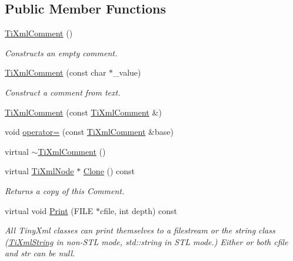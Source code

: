 \subsection*{Public Member Functions}
\begin{DoxyCompactItemize}
\item 
\hyperlink{classTiXmlComment_aaa3252031d3e8bd3a2bf51a1c61201b7}{TiXmlComment} ()
\begin{DoxyCompactList}\small\item\em Constructs an empty comment. \item\end{DoxyCompactList}\item 
\hyperlink{classTiXmlComment_a37e7802ef17bc03ebe5ae79bf0713d47}{TiXmlComment} (const char $\ast$\_\-value)
\begin{DoxyCompactList}\small\item\em Construct a comment from text. \item\end{DoxyCompactList}\item 
\hyperlink{classTiXmlComment_afaec41ac2760ce946ba1590eb5708e50}{TiXmlComment} (const \hyperlink{classTiXmlComment}{TiXmlComment} \&)
\item 
void \hyperlink{classTiXmlComment_a46373f99b65cb960637dccb1f126bd49}{operator=} (const \hyperlink{classTiXmlComment}{TiXmlComment} \&base)
\item 
virtual \hyperlink{classTiXmlComment_a3264ae2e9c4a127edfa03289bb2c9aa2}{$\sim$TiXmlComment} ()
\item 
virtual \hyperlink{classTiXmlNode}{TiXmlNode} $\ast$ \hyperlink{classTiXmlComment_a4f6590c9c9a2b63a48972655b78eb853}{Clone} () const 
\begin{DoxyCompactList}\small\item\em Returns a copy of this Comment. \item\end{DoxyCompactList}\item 
virtual void \hyperlink{classTiXmlComment_a17398061d62c470f57801ce28fa33ad4}{Print} (FILE $\ast$cfile, int depth) const 
\begin{DoxyCompactList}\small\item\em All TinyXml classes can print themselves to a filestream or the string class (\hyperlink{classTiXmlString}{TiXmlString} in non-\/STL mode, std::string in STL mode.) Either or both cfile and str can be null. \item\end{DoxyCompactList}\item 

\end{DoxyCompactItemize}
